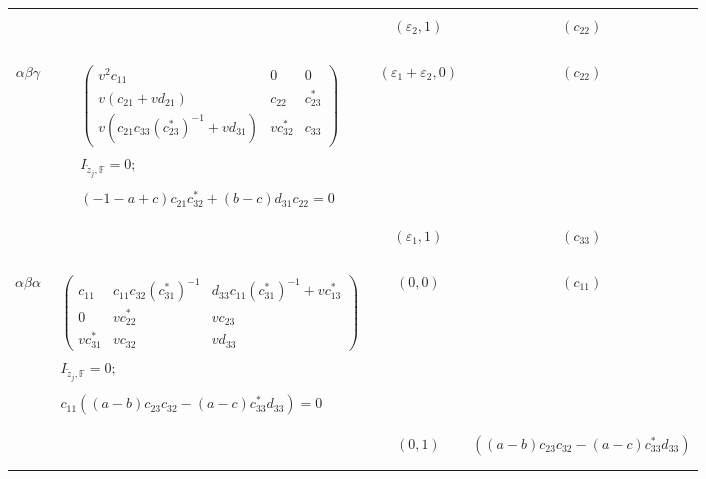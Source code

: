 \documentclass[oneside,a4paper,english, 11pt]{amsart}
\theoremstyle{plain}
\theoremstyle{plain}
\theoremstyle{plain}
\theoremstyle{plain}
\theoremstyle{plain}
\theoremstyle{plain}
\theoremstyle{definition}
\theoremstyle{definition}
\theoremstyle{definition}
\theoremstyle{remark}
\numberwithin{equation}{section}
\newcommand{\F}{\mathbb{F}}
\newcommand{\eps}{\varepsilon}
\newcommand{\tld}[1]{\widetilde{#1}}
\begin{document}
\begin{table}[H]
{\begin{tabular}{| c | c | c | c |}
\cline{3-4}&&&\\
&&$(\eps_2,1)$&$(c_{22})$ 
\\
&&&\\
&&&\\
&&&\\
\hline
\hline
&&&\\
\multirow{2}{*}{$\alpha\beta\gamma$}&\multirow{2}{*}{$\begin{matrix}\begin{pmatrix}v^2c_{11}&0&0\\v(c_{21}+vd_{21})&c_{22}&c_{23}^*\\v(c_{21}c_{33}(c_{23}^*)^{-1}+v d_{31})&vc^*_{32}&c_{33}\end{pmatrix}\\
\\
I_{\tld{z}_j,\F}=0;\\
\\
(-1-a+c)c_{21}c^*_{32}+(b-c)d_{31}c_{22}=0
\end{matrix}$}&$(\eps_1+\eps_2,0)$&$(c_{22})$ 
\\
&&&\\
&&&\\
\cline{3-4}&&&\\
&&
$(\eps_1,1)$&$(c_{33})$ \\
&&&\\
&&&\\
&&&\\
\hline
\hline
&&&\\
\multirow{2}{*}{$\alpha\beta\alpha$}&\multirow{2}{*}{$
\begin{matrix}
\begin{pmatrix}
c_{11}&c_{11}c_{32}(c^{*}_{31})^{-1}&d_{33}c_{11}(c^{*}_{31})^{-1}+vc_{13}^{*}\\
0&v c^{*}_{22}& vc_{23} \\
v c^{*}_{31}&v c_{32}&v d_{33}
\end{pmatrix}\\
\\
I_{\tld{z}_j,\F}=0;
\\
\\
c_{11}((a-b)c_{23}c_{32}-(a-c)c^{*}_{33}d_{33})=0
\end{matrix}
$}&$(0,0)$&$(c_{11})$
\\
&&&\\
&&&\\
\cline{3-4}&&&\\
&&
$(0,1)$&$((a-b)c_{23}c_{32}-(a-c)c^{*}_{33}d_{33})$ \\
&&&\\
&&&\\

\end{tabular}}
\end{table}
\end{document}
